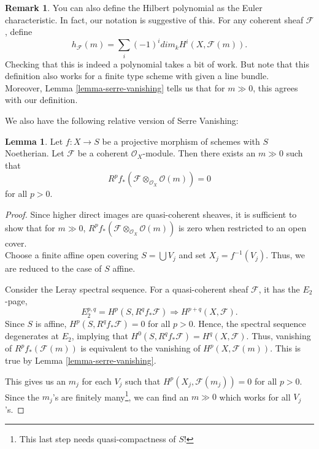 \documentclass[11pt]{amsart}
\newcommand{\sF}{{\mathcal F}}
\theoremstyle{definition}
\newtheorem{lemma}[theorem]{Lemma}
\newtheorem{remark}[theorem]{Remark}
\begin{document}
\begin{remark}
	You can also define the Hilbert polynomial as the Euler characteristic. In fact, our notation is suggestive of this. For any coherent sheaf $\sF$, define
	\[h_{\sF}(m)= \sum_i (-1)^i dim_k H^i(X,\sF(m)).\]
	Checking that this is indeed a polynomial takes a bit of work. But note that this definition also works for a finite type scheme with given a line bundle.\\
	Moreover, Lemma \ref{lemma-serre-vanishing} tells us that for $m\gg 0$, this agrees with our definition.
\end{remark}

We also have the following relative version of Serre Vanishing:

\begin{lemma}\cite[Tag 02O1]{stacks-project}
	\label{lemma-relative-serre-vanishing}
	Let $f : X \to S$ be a projective morphism of schemes with $S$ Noetherian.
	Let $\mathcal{F}$ be a coherent $\mathcal{O}_X$-module.
	Then there exists an $m\gg 0$ such that
	$$
	R^pf_*\left(\mathcal{F} \otimes_{\mathcal{O}_X} \mathcal{O}(m)\right)
	=
	0
	$$
	for all $p > 0$.
\end{lemma}

\begin{proof}
	Since higher direct images are quasi-coherent sheaves, it is sufficient to show that for $m\gg 0$, $R^pf_*\left(\mathcal{F} \otimes_{\mathcal{O}_X} \mathcal{O}(m)\right)$ is zero when restricted to an open cover.\\
	Choose a finite affine open covering $S = \bigcup V_j$ and
	set $X_j = f^{-1}(V_j)$. Thus, we are reduced to the case of $S$ affine.
	
	Consider the Leray spectral sequence. For a quasi-coherent sheaf $\sF$, it has the $E_2$-page,
	\[E_2^{p,q}=H^p(S,R^qf_*\sF)\Rightarrow H^{p+q}(X,\sF).\]
	Since $S$ is affine, $H^p(S,R^qf_*\sF)=0$ for all $p>0$. Hence, the spectral sequence degenerates at $E_2$, implying that $H^0(S,R^qf_*\sF)= H^{q}(X,\sF)$. Thus, vanishing of
	$R^pf_*(\mathcal{F}(m))$
	is equivalent to the vanishing of
	$H^p(X, \mathcal{F}(m))$. This is true by Lemma \ref{lemma-serre-vanishing}.
	
	This gives us an $m_j$ for each $V_j$ such that $H^p(X_j, \mathcal{F}(m_j))=0$ for all $p>0$. Since the $m_j$'s are finitely many\footnote{This last step needs quasi-compactness of $S$!}, we can find an $m\gg 0$ which works for all $V_j$'s.
\end{proof}
\end{document}
